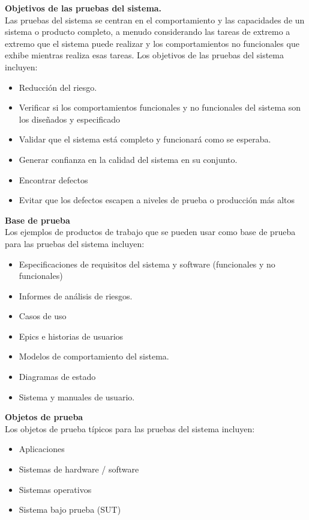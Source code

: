 \textbf {Objetivos de las pruebas del sistema.}\\

Las pruebas del sistema se centran en el comportamiento y las capacidades de un sistema o producto completo, a menudo considerando las tareas de extremo a extremo que el sistema puede realizar y los comportamientos no funcionales que exhibe mientras realiza esas tareas. Los objetivos de las pruebas del sistema incluyen:

\begin{itemize}
	\item Reducción del riesgo.
	\item Verificar si los comportamientos funcionales y no funcionales del sistema son los diseñados y
	especificado
	\item Validar que el sistema está completo y funcionará como se esperaba.
	\item Generar confianza en la calidad del sistema en su conjunto.
	\item Encontrar defectos
	\item Evitar que los defectos escapen a niveles de prueba o producción más altos
\end{itemize}

\textbf {Base de prueba}\\
Los ejemplos de productos de trabajo que se pueden usar como base de prueba para las pruebas del sistema incluyen:

\begin{itemize}
	\item Especificaciones de requisitos del sistema y software (funcionales y no funcionales)
	\item Informes de análisis de riesgos.
	\item Casos de uso
	\item Epics e historias de usuarios
	\item Modelos de comportamiento del sistema.
	\item Diagramas de estado
	\item Sistema y manuales de usuario.
\end{itemize}

\textbf {Objetos de prueba}\\
Los objetos de prueba típicos para las pruebas del sistema incluyen:

\begin{itemize}
	\item Aplicaciones
	\item Sistemas de hardware / software
	\item Sistemas operativos
	\item Sistema bajo prueba (SUT)
\end{itemize}


